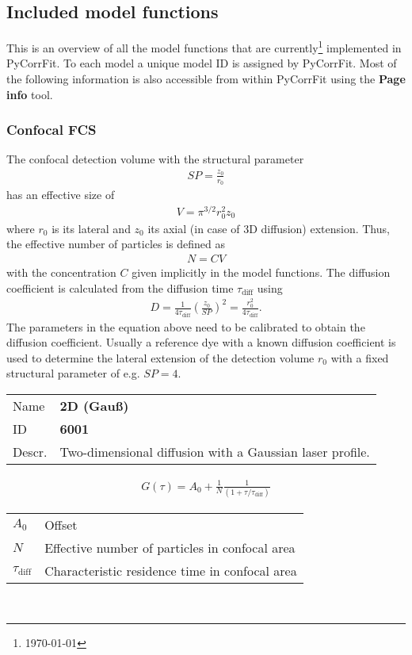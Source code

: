 \subsection{Included model functions}
This is an overview of all the model functions that are currently\footnote{\today} implemented in PyCorrFit. To each model a unique model ID is assigned by PyCorrFit. Most of the following information is also accessible from within PyCorrFit using the \textbf{Page info} tool.

\subsubsection{Confocal FCS}
The confocal detection volume with the structural parameter 
\begin{align}
\mathit{SP}= \frac{z_0}{r_0}
\end{align}
has an effective size of
\begin{align}
V = \pi^{3/2} r_0^2 z_0
\end{align}
where $r_0$ is its lateral and $z_0$ its axial (in case of 3D diffusion) extension. Thus, the effective number of particles is defined as
\begin{align}
N = C V
\end{align}
with the concentration $C$ given implicitly in the model functions.
The diffusion coefficient is calculated from the diffusion time $\tau_\mathrm{diff}$ using
\begin{align}
D = \frac{1}{4 \tau_\mathrm{diff}} \left( \frac{z_0}{\mathit{SP}} \right)^2 = \frac{r_0^2}{4 \tau_\mathrm{diff}}.
\end{align}
The parameters in the equation above need to be calibrated to obtain the diffusion coefficient. Usually a reference dye with a known diffusion coefficient is used to determine the lateral extension of the detection volume $r_0$ with a fixed structural parameter of e.g. $\mathit{SP}=4$.\\
\vspace{2em}


\noindent \begin{tabular}{lp{}}
Name & \textbf{2D (Gauß)} \\ 
ID & \textbf{6001} \\ 
Descr. &  Two-dimensional diffusion with a Gaussian laser profile. \\ 
\end{tabular}
\begin{align}
G(\tau) = A_0 + \frac{1}{N} \frac{1}{(1+\tau/\tau_\mathrm{diff})}
\end{align} 
\begin{center}
\begin{tabular}{ll}
$A_0$ & Offset \\ 
$N$ & Effective number of particles in confocal area \\ 
$\tau_\mathrm{diff}$ &   Characteristic residence time in confocal area \\
\end{tabular} \\
\end{center}
\vspace{2em}



